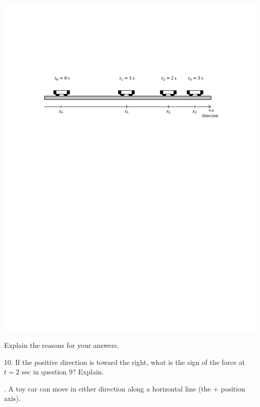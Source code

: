 \vspace{0.3cm}
{\par\centering \includegraphics{force2/carts_slowing_hw2.pdf} \par}
\vspace{0.3cm}

Explain the reasons for your answers.
\answerspace{25mm}

10. If the positive direction is toward the right, what is the sign of the force
at $t = 2$ sec in question 9? Explain.
\answerspace{25mm}

. A toy car can move in either direction along a horizontal line (the + position
axis).


